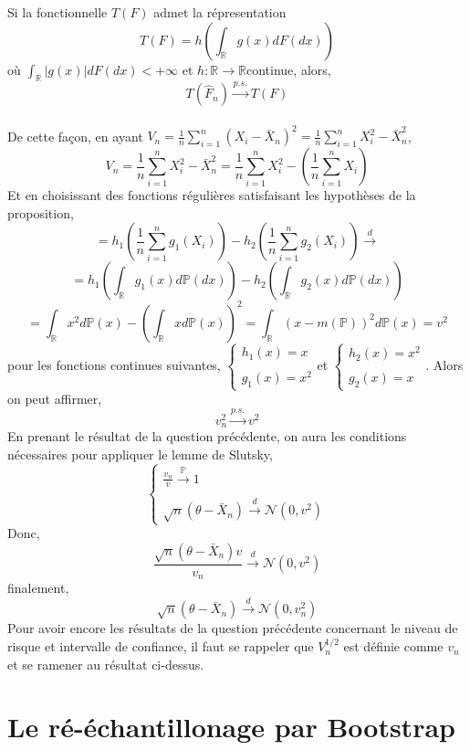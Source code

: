 \documentclass{article}
\newcommand{\R}{\mathbb{R}}
\begin{document}
Si la fonctionnelle $\displaystyle T(F)$ admet la répresentation
$$T(F)=h\left(\int_{\R}g(x)dF(dx)\right)$$
où $\displaystyle \int_{\R}|g(x)|dF(dx)<+\infty$ et $\displaystyle h: \R\rightarrow\R$continue, alors,
$$ T(\hat F_n)\overset{p.s.}{\longrightarrow}T(F)$$
\\
De cette façon, en ayant $\displaystyle V_n=\frac{1}{n}\sum_{i=1}^n(X_i -\bar X_ n)^2=\frac{1}{n}\sum_{i=1}^nX_i^2-\bar X_n^2$,
$$V_n=\frac{1}{n}\sum_{i=1}^nX_i^2-\bar X_n^2=\frac{1}{n}\sum_{i=1}^nX_i^2-\left(\frac{1}{n}\sum_{i=1}^nX_i\right)$$
Et en choisissant des fonctions régulières satisfaisant les hypothèses de la proposition,
$$=h_{1}\left(\frac{1}{n}\sum_{i=1}^n g_{1}(X_i)\right)-h_{2}\left(\frac{1}{n}\sum_{i=1}^n g_{2}(X_i)\right)\overset{d}{\longrightarrow}$$
$$=h_1\left(\int_{\R}g_1(x)d\mathbb{P}(dx)\right)-h_2\left(\int_{\R}g_2(x)d\mathbb{P}(dx)\right)$$
$$=\int_{\R}x^2d\mathbb{P}(x)-\left({\int_{\R}xd\mathbb{P}(x)}\right)^2=\int_{\R}(x-m(\mathbb{P}))^2d\mathbb{P}(x)=v^2$$
pour les fonctions continues suivantes,
$ \left\{
\begin{array}{ll}
\displaystyle h_1(x)=x \\ \\
\displaystyle g_1(x)=x^2
\end{array}
\right.
$et
$ \left\{
\begin{array}{ll}
\displaystyle h_2(x)=x^2 \\ \\
\displaystyle g_2(x)=x
\end{array}
\right.
$.
Alors on peut affirmer,
$$v_{n}^2\overset{p.s.}{\longrightarrow}v^2$$
En prenant le résultat de la question précédente, on aura les conditions nécessaires pour appliquer le lemme de Slutsky,
$$ \left\{
\begin{array}{ll}
\displaystyle \frac{v_{n}}{v}\overset{\mathbb{P}}{\longrightarrow} 1\\ \\
\displaystyle \sqrt{n}(\theta-\bar X_{n})\overset{d}{\longrightarrow}\mathcal{N}(0,v^2)
\end{array}
\right.
$$
Donc,
$$\frac{\sqrt{n}(\theta-\bar X_{n})v}{v_{n}}\overset{d}{\longrightarrow}\mathcal{N}(0,v^2)$$
finalement,
$$ \sqrt{n}(\theta-\bar X_{n})\overset{d}{\longrightarrow}\mathcal{N}(0,v_{n}^{2})$$
Pour avoir encore les résultats de la question précédente concernant le niveau de risque et intervalle de confiance, il faut se rappeler que $\displaystyle V_{n}^{1/2}$ est définie comme $\displaystyle v_{n}$ et se ramener au résultat ci-dessus.
\section{Le ré-échantillonage par Bootstrap}
\end{document}
